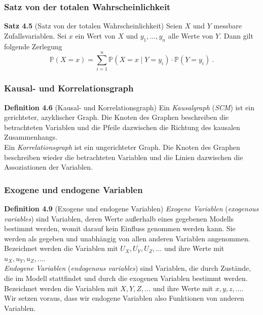 \documentclass{beamer}
\newcommand{\en}[1]{{\scriptsize(\textit{#1})}}
\newcommand{\klein}[1]{{\scriptsize #1}}
\begin{document}
\begin{frame}
\frametitle{Satz von der totalen Wahrscheinlichkeit}

\begin{block}{\textbf{Satz 4.5} \klein{(Satz von der totalen Wahrscheinlichkeit)}}
Seien $X$ und $Y$ messbare Zufallsvariablen. Sei $x$ ein Wert von $X$ und $y_1, \dots, y_n$ alle Werte von $Y$. Dann gilt folgende Zerlegung
\[\mathbb{P}(X = x) = \sum_{i=1}^n \mathbb{P}(X = x \mid Y = y_i) \cdot \mathbb{P}(Y = y_i)~.\]
\end{block}
\end{frame}

\begin{frame}
\frametitle{Kausal- und Korrelationsgraph}

\begin{block}{\textbf{Definition 4.6} \klein{(Kausal- und Korrelationsgraph)}}
Ein \textit{Kausalgraph} \en{SCM} ist ein gerichteter, azyklischer Graph. Die Knoten des Graphen beschreiben die betrachteten Variablen und die Pfeile dazwischen die Richtung des kausalen Zusammenhangs.\\
\pause
Ein \textit{Korrelationsgraph} ist ein ungerichteter Graph. Die Knoten des Graphen beschreiben wieder die betrachteten Variablen und die Linien dazwischen die Assoziationen der Variablen.
\end{block}
\end{frame}

\begin{frame}
\frametitle{Exogene und endogene Variablen}

\begin{block}{\textbf{Definition 4.9} (Exogene und endogene Variablen)}
\textit{Exogene Variablen} \en{exogenous variables} sind Variablen, deren Werte außerhalb eines gegebenen Modells bestimmt werden, womit darauf kein Einfluss genommen werden kann. Sie werden als gegeben und unabhängig von allen anderen Variablen angenommen. Bezeichnet werden die Variablen mit $U_X, U_Y, U_Z, \dots$ und ihre Werte mit $u_X, u_Y, u_Z, \dots$.\\
\pause
\textit{Endogene Variablen} \en{endogenous variables} sind Variablen, die durch Zustände, die im Modell stattfindet und durch die exogenen Variablen bestimmt werden. Bezeichnet werden die Variablen mit $X, Y, Z, \dots$ und ihre Werte mit $x, y, z, \dots$.\\
Wir setzen voraus, dass wir endogene Variablen also Funktionen von anderen Variablen.
\end{block}
\end{frame}
\end{document}
